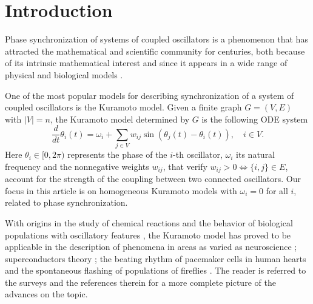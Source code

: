 \documentclass[a4paper,11pt]{amsart}
\numberwithin{equation}{section}
\numberwithin{theorem}{section}
\theoremstyle{definition}
\begin{document}

\section{Introduction}\label{sec:intro}

Phase synchronization of systems of coupled oscillators is a phenomenon that has attracted the mathematical and scientific community for centuries, both because of its intrinsic mathematical interest \cite{chiba2016mean, medvedev2018continuum, bertini2014synchronization, coppini2020law} and since it appears in a wide range of physical and biological models \cite{mirollo1990synchronization, winfree1967biological, acebron2005kuramoto, bullo2020lectures, arenas2008synchronization, dorflerSurvey, strogatz2004sync, strogatz2000kuramoto}.

One of the most popular models for describing synchronization of a system of coupled oscillators is the Kuramoto model. Given a finite graph $G=(V,E)$ with $|V|=n$, the Kuramoto model determined by $G$ is the following ODE system 
\begin{equation}
\label{kuramoto.graph}
\frac{d}{dt}\theta_i(t)=\omega_i + \sum_{j\in V} w_{ij}\sin(\theta_j(t)-\theta_i(t)), \quad i \in V.
\end{equation}
Here $\theta_i\in[0,2\pi)$ represents the phase of the $i$-th oscillator, $\omega_i$ its natural frequency and the nonnegative weights $w_{ij}$, that verify $w_{ij}>0 \Leftrightarrow \{i,j\}\in E$, account for the strength of the coupling between two connected oscillators. Our focus in this article is on homogeneous Kuramoto models with $\omega_i=0$ for all $i$, related to phase synchronization.

With origins in the study of chemical reactions and the behavior of biological populations with oscillatory features \cite{kuramoto1975self,kuramoto1984chemical}, the Kuramoto model has proved to be applicable in the description of phenomena in areas as varied as neuroscience \cite{cumin2007generalising,breakspear2010generative}; superconductors theory \cite{wiesenfeld1996synchronization}; the beating rhythm of pacemaker cells in human hearts \cite{peskin1975mathematical} and the spontaneous flashing of populations of fireflies \cite{mirollo1990synchronization}. The reader is referred to  the surveys  \cite{dorfler2013synchronization,acebron2005kuramoto,rodrigues2016kuramoto, strogatz2000kuramoto} and the references therein for a more complete picture of the advances on the topic.
\end{document}
